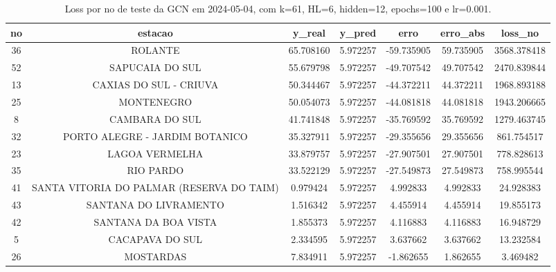 \begin{table}[h]
\centering
\caption{Loss por no de teste da GCN em 2024-05-04, com k=61, HL=6, hidden=12, epochs=100 e lr=0.001.}
\label{tab:gcn_loss_k61_hl6_h12_e100_d20240504}
\begin{tabular}{ccccccc}
\toprule
no & estacao & y\_real & y\_pred & erro & erro\_abs & loss\_no \\
\midrule
36 & ROLANTE & 65.708160 & 5.972257 & -59.735905 & 59.735905 & 3568.378418 \\
52 & SAPUCAIA DO SUL & 55.679798 & 5.972257 & -49.707542 & 49.707542 & 2470.839844 \\
13 & CAXIAS DO SUL - CRIUVA & 50.344467 & 5.972257 & -44.372211 & 44.372211 & 1968.893188 \\
25 & MONTENEGRO & 50.054073 & 5.972257 & -44.081818 & 44.081818 & 1943.206665 \\
8 & CAMBARA DO SUL & 41.741848 & 5.972257 & -35.769592 & 35.769592 & 1279.463745 \\
32 & PORTO ALEGRE - JARDIM BOTANICO & 35.327911 & 5.972257 & -29.355656 & 29.355656 & 861.754517 \\
23 & LAGOA VERMELHA & 33.879757 & 5.972257 & -27.907501 & 27.907501 & 778.828613 \\
35 & RIO PARDO & 33.522129 & 5.972257 & -27.549873 & 27.549873 & 758.995544 \\
41 & SANTA VITORIA DO PALMAR (RESERVA DO TAIM) & 0.979424 & 5.972257 & 4.992833 & 4.992833 & 24.928383 \\
43 & SANTANA DO LIVRAMENTO & 1.516342 & 5.972257 & 4.455914 & 4.455914 & 19.855173 \\
42 & SANTANA DA BOA VISTA & 1.855373 & 5.972257 & 4.116883 & 4.116883 & 16.948729 \\
5 & CACAPAVA DO SUL & 2.334595 & 5.972257 & 3.637662 & 3.637662 & 13.232584 \\
26 & MOSTARDAS & 7.834911 & 5.972257 & -1.862655 & 1.862655 & 3.469482 \\
\bottomrule
\end{tabular}
\end{table}
